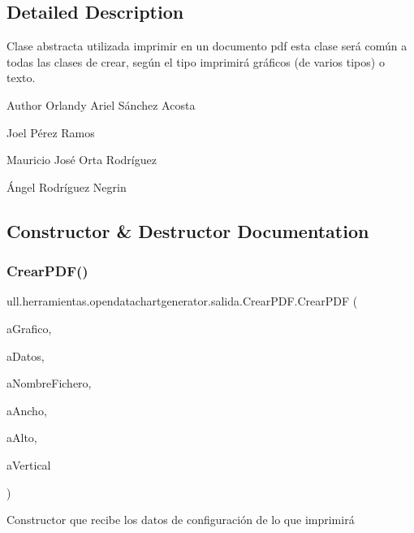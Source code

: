 \subsection{Detailed Description}
Clase abstracta utilizada imprimir en un documento pdf esta clase será común a todas las clases de crear, según el tipo imprimirá gráficos (de varios tipos) o texto. 

\begin{DoxyAuthor}{Author}
Orlandy Ariel Sánchez Acosta 

Joel Pérez Ramos 

Mauricio José Orta Rodríguez 

Ángel Rodríguez Negrin 
\end{DoxyAuthor}


\subsection{Constructor \& Destructor Documentation}
\mbox{\label{classull_1_1herramientas_1_1opendatachartgenerator_1_1salida_1_1_crear_p_d_f_acd132a09817a3498db8e34ffa53ec8ce}} 
\subsubsection{\texorpdfstring{Crear\+P\+D\+F()}{CrearPDF()}}
{\footnotesize\ttfamily ull.\+herramientas.\+opendatachartgenerator.\+salida.\+Crear\+P\+D\+F.\+Crear\+P\+DF (\begin{DoxyParamCaption}\item[{J\+Free\+Chart}]{a\+Grafico,  }\item[{String}]{a\+Datos,  }\item[{String}]{a\+Nombre\+Fichero,  }\item[{int}]{a\+Ancho,  }\item[{int}]{a\+Alto,  }\item[{boolean}]{a\+Vertical }\end{DoxyParamCaption})}



Constructor que recibe los datos de configuración de lo que imprimirá 


